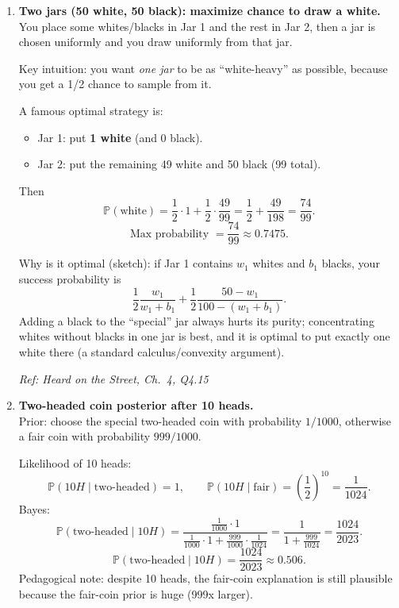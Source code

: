 \documentclass[11pt]{article}
\begin{document}
\begin{enumerate}[label=\textbf{\arabic*.}, resume]

\item \textbf{Two jars (50 white, 50 black): maximize chance to draw a white.}\\
You place some whites/blacks in Jar 1 and the rest in Jar 2, then a jar is chosen uniformly and you draw uniformly from that jar.

Key intuition: you want \emph{one jar} to be as ``white-heavy'' as possible, because you get a 1/2 chance to sample from it.

A famous optimal strategy is:
\begin{itemize}
\item Jar 1: put \textbf{1 white} (and 0 black).
\item Jar 2: put the remaining 49 white and 50 black (99 total).
\end{itemize}
Then
\[
\mathbb{P}(\text{white})=\frac12\cdot 1 + \frac12\cdot \frac{49}{99}
=\frac12+\frac{49}{198}=\frac{74}{99}.
\]
\[
\boxed{\text{Max probability }=\frac{74}{99}\approx 0.7475.}
\]

Why is it optimal (sketch): if Jar 1 contains $w_1$ whites and $b_1$ blacks, your success probability is
\[
\frac12\frac{w_1}{w_1+b_1}+\frac12\frac{50-w_1}{100-(w_1+b_1)}.
\]
Adding a black to the ``special'' jar always hurts its purity; concentrating whites without blacks in one jar is best, and it is optimal to put exactly one white there (a standard calculus/convexity argument).

\hfill{\small\textit{Ref: Heard on the Street, Ch.\ 4, Q4.15}}

\item \textbf{Two-headed coin posterior after 10 heads.}\\
Prior: choose the special two-headed coin with probability $1/1000$, otherwise a fair coin with probability $999/1000$.

Likelihood of 10 heads:
\[
\mathbb{P}(10H \mid \text{two-headed})=1,\qquad
\mathbb{P}(10H \mid \text{fair})=\left(\frac12\right)^{10}=\frac{1}{1024}.
\]
Bayes:
\[
\mathbb{P}(\text{two-headed}\mid 10H)
=\frac{\frac{1}{1000}\cdot 1}{\frac{1}{1000}\cdot 1 + \frac{999}{1000}\cdot \frac{1}{1024}}
=\frac{1}{1+\frac{999}{1024}}
=\frac{1024}{2023}.
\]
\[
\boxed{\mathbb{P}(\text{two-headed}\mid 10H)=\frac{1024}{2023}\approx 0.506.}
\]
Pedagogical note: despite 10 heads, the fair-coin explanation is still plausible because the fair-coin prior is huge (999x larger).


\end{enumerate}
\end{document}
